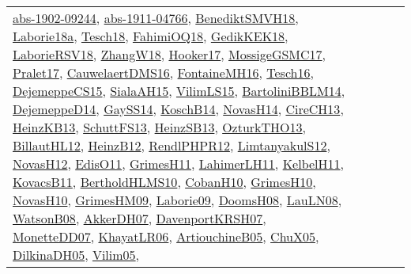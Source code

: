 {\begin{longtable}{llp{6cm}p{6cm}p{6cm}}
\href{articles/abs-1902-09244.pdf}{abs-1902-09244}\cite{abs-1902-09244}, \href{articles/abs-1911-04766.pdf}{abs-1911-04766}\cite{abs-1911-04766}, \href{papers/BenediktSMVH18.pdf}{BenediktSMVH18}\cite{BenediktSMVH18}, \href{papers/Laborie18a.pdf}{Laborie18a}\cite{Laborie18a}, \href{papers/Tesch18.pdf}{Tesch18}\cite{Tesch18}, \href{articles/FahimiOQ18.pdf}{FahimiOQ18}\cite{FahimiOQ18}, \href{articles/GedikKEK18.pdf}{GedikKEK18}\cite{GedikKEK18}, \href{articles/LaborieRSV18.pdf}{LaborieRSV18}\cite{LaborieRSV18}, \href{articles/ZhangW18.pdf}{ZhangW18}\cite{ZhangW18}, \href{papers/Hooker17.pdf}{Hooker17}\cite{Hooker17}, \href{papers/MossigeGSMC17.pdf}{MossigeGSMC17}\cite{MossigeGSMC17}, \href{papers/Pralet17.pdf}{Pralet17}\cite{Pralet17}, \href{papers/CauwelaertDMS16.pdf}{CauwelaertDMS16}\cite{CauwelaertDMS16}, \href{papers/FontaineMH16.pdf}{FontaineMH16}\cite{FontaineMH16}, \href{papers/Tesch16.pdf}{Tesch16}\cite{Tesch16}, \href{papers/DejemeppeCS15.pdf}{DejemeppeCS15}\cite{DejemeppeCS15}, \href{papers/SialaAH15.pdf}{SialaAH15}\cite{SialaAH15}, \href{papers/VilimLS15.pdf}{VilimLS15}\cite{VilimLS15}, \href{papers/BartoliniBBLM14.pdf}{BartoliniBBLM14}\cite{BartoliniBBLM14}, \href{papers/DejemeppeD14.pdf}{DejemeppeD14}\cite{DejemeppeD14}, \href{papers/GaySS14.pdf}{GaySS14}\cite{GaySS14}, \href{papers/KoschB14.pdf}{KoschB14}\cite{KoschB14}, \href{articles/NovasH14.pdf}{NovasH14}\cite{NovasH14}, \href{papers/CireCH13.pdf}{CireCH13}\cite{CireCH13}, \href{papers/HeinzKB13.pdf}{HeinzKB13}\cite{HeinzKB13}, \href{papers/SchuttFS13.pdf}{SchuttFS13}\cite{SchuttFS13}, \href{articles/HeinzSB13.pdf}{HeinzSB13}\cite{HeinzSB13}, \href{articles/OzturkTHO13.pdf}{OzturkTHO13}\cite{OzturkTHO13}, \href{papers/BillautHL12.pdf}{BillautHL12}\cite{BillautHL12}, \href{papers/HeinzB12.pdf}{HeinzB12}\cite{HeinzB12}, \href{papers/RendlPHPR12.pdf}{RendlPHPR12}\cite{RendlPHPR12}, \href{articles/LimtanyakulS12.pdf}{LimtanyakulS12}\cite{LimtanyakulS12}, \href{articles/NovasH12.pdf}{NovasH12}\cite{NovasH12}, \href{papers/EdisO11.pdf}{EdisO11}\cite{EdisO11}, \href{papers/GrimesH11.pdf}{GrimesH11}\cite{GrimesH11}, \href{papers/LahimerLH11.pdf}{LahimerLH11}\cite{LahimerLH11}, \href{articles/KelbelH11.pdf}{KelbelH11}\cite{KelbelH11}, \href{articles/KovacsB11.pdf}{KovacsB11}\cite{KovacsB11}, \href{papers/BertholdHLMS10.pdf}{BertholdHLMS10}\cite{BertholdHLMS10}, \href{papers/CobanH10.pdf}{CobanH10}\cite{CobanH10}, \href{papers/GrimesH10.pdf}{GrimesH10}\cite{GrimesH10}, \href{articles/NovasH10.pdf}{NovasH10}\cite{NovasH10}, \href{papers/GrimesHM09.pdf}{GrimesHM09}\cite{GrimesHM09}, \href{papers/Laborie09.pdf}{Laborie09}\cite{Laborie09}, \href{papers/DoomsH08.pdf}{DoomsH08}\cite{DoomsH08}, \href{papers/LauLN08.pdf}{LauLN08}\cite{LauLN08}, \href{papers/WatsonB08.pdf}{WatsonB08}\cite{WatsonB08}, \href{papers/AkkerDH07.pdf}{AkkerDH07}\cite{AkkerDH07}, \href{papers/DavenportKRSH07.pdf}{DavenportKRSH07}\cite{DavenportKRSH07}, \href{papers/MonetteDD07.pdf}{MonetteDD07}\cite{MonetteDD07}, \href{articles/KhayatLR06.pdf}{KhayatLR06}\cite{KhayatLR06}, \href{papers/ArtiouchineB05.pdf}{ArtiouchineB05}\cite{ArtiouchineB05}, \href{papers/ChuX05.pdf}{ChuX05}\cite{ChuX05}, \href{papers/DilkinaDH05.pdf}{DilkinaDH05}\cite{DilkinaDH05}, \href{papers/Vilim05.pdf}{Vilim05}\cite{Vilim05}, 
\end{longtable}}
